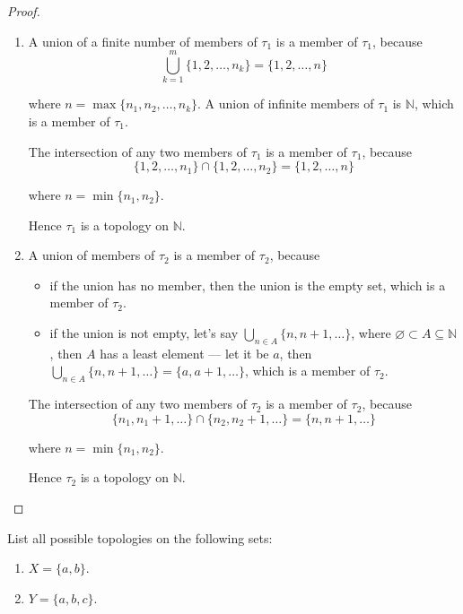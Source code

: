 \begin{proof}
	\begin{enumerate}[label={(\roman*)}]
		\item A union of a finite number of members of $\tau_{1}$ is a member of $\tau_{1}$, because
		      \[
			      \bigcup^{m}_{k=1} \{ 1, 2, \ldots, n_{k} \} = \{ 1, 2, \ldots, n \}
		      \]

		      where $n = \max\{ n_{1}, n_{2}, \ldots, n_{k} \}$. A union of infinite members of $\tau_{1}$ is $\mathbb{N}$, which is a member of $\tau_{1}$.

		      The intersection of any two members of $\tau_{1}$ is a member of $\tau_{1}$, because
		      \[
			      \{ 1, 2, \ldots, n_{1} \} \cap \{ 1, 2, \ldots, n_{2} \} = \{ 1, 2, \ldots, n \}
		      \]

		      where $n = \min\{ n_{1}, n_{2} \}$.

		      Hence $\tau_{1}$ is a topology on $\mathbb{N}$.
		\item A union of members of $\tau_{2}$ is a member of $\tau_{2}$, because
		      \begin{itemize}
			      \item if the union has no member, then the union is the empty set, which is a member of $\tau_{2}$.
			      \item if the union is not empty, let's say $\bigcup_{n\in A} \{ n, n + 1, \ldots \}$, where $\varnothing\subset A\subseteq \mathbb{N}$, then $A$ has a least element --- let it be $a$, then $\bigcup_{n\in A} \{ n, n + 1, \ldots \} = \{ a, a+1, \ldots \}$, which is a member of $\tau_{2}$.
		      \end{itemize}

		      The intersection of any two members of $\tau_{2}$ is a member of $\tau_{2}$, because
		      \[
			      \{ n_{1}, n_{1} + 1, \ldots \}\cap \{ n_{2}, n_{2} + 1, \ldots \} = \{ n, n+1, \ldots \}
		      \]

		      where $n = \min\{ n_{1}, n_{2} \}$.

		      Hence $\tau_{2}$ is a topology on $\mathbb{N}$.
	\end{enumerate}
\end{proof}
\newpage

\begin{exercise}
	List all possible topologies on the following sets:
	\begin{enumerate}[label={(\alph*)}]
		\item $X = \{ a, b \}$.
		\item $Y = \{ a, b, c \}$.
	\end{enumerate}
\end{exercise}

